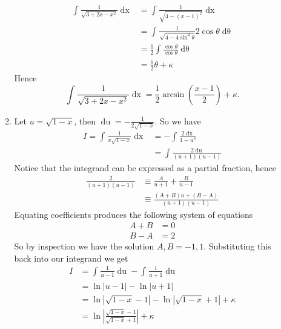 \documentclass[12pt,oneside]{book}
\begin{document}
\begin{enumerate}
\begin{enumerate}
\begin{align*}
                \int_{}^{} \frac{1}{\sqrt{3 + 2x - x^2}} \mathop{\mathrm{d}x}  &= \int_{}^{} \frac{1}{\sqrt{4 - (x-1)^2} } \mathop{\mathrm{d}x} \\
                &= \int_{}^{} \frac{1}{\sqrt{4 - 4 \sin^2 \theta} } 2 \cos \theta \mathop{\mathrm{d}\theta} \\
                &= \frac{1}{2} \int_{}^{} \frac{\cos \theta}{\cos \theta} \mathop{\mathrm{d}\theta} \\
                &= \frac{1}{2} \theta + \kappa
            \end{align*}
            Hence \[
                \int_{}^{} \frac{1}{\sqrt{3 + 2x - x^2}} \mathop{\mathrm{d}x} = \frac{1}{2} \arcsin \left( \frac{x-1}{2} \right) + \kappa
            .\] 
            \item Let $u = \sqrt{1-x}$, then $\mathop{\mathrm{d}u} = - \frac{1}{2\sqrt{1-x}}$. So we have \begin{align*}
                I = \int_{}^{} \frac{1}{x \sqrt{1-x} } \mathop{\mathrm{d}x} &= - \int_{}^{} \frac{2 \mathop{\mathrm{d}x} }{1 - u^2} \\
                &= \int_{}^{} \frac{2 \mathop{\mathrm{d}u}}{(u + 1) (u - 1)}    
            \end{align*} 
            Notice that the integrand can be expressed as a partial fraction, hence \begin{align*}
                \frac{2}{(u + 1) (u - 1)} &\equiv \frac{A}{u + 1} + \frac{B}{u - 1}\\
                &\equiv \frac{(A + B) u + (B - A)}{(u+1)(u-1)}
            \end{align*}
            Equating coefficients produces the following system of equations \begin{align*}
                A + B &= 0 \\
                B - A &= 2
            \end{align*}
            So by inspection we have the solution $A, B = -1, 1$. Substituting this back into our integrand we get \begin{align*}
                I &= \int_{}^{} \frac{1}{u-1} \mathop{\mathrm{d}u} - \int_{}^{} \frac{1}{u + 1} \mathop{\mathrm{d}u} \\
                &= \ln \left| u - 1 \right| - \ln \left| u + 1 \right| \\
                &= \ln \left| \sqrt{1-x} -1 \right| - \ln \left| \sqrt{1-x} +1 \right| + \kappa \\
                &= \ln \left| \frac{\sqrt{1-x} -1}{\sqrt{1-x} +1} \right| + \kappa

\end{align*}
\end{enumerate}
\end{enumerate}
\end{document}
